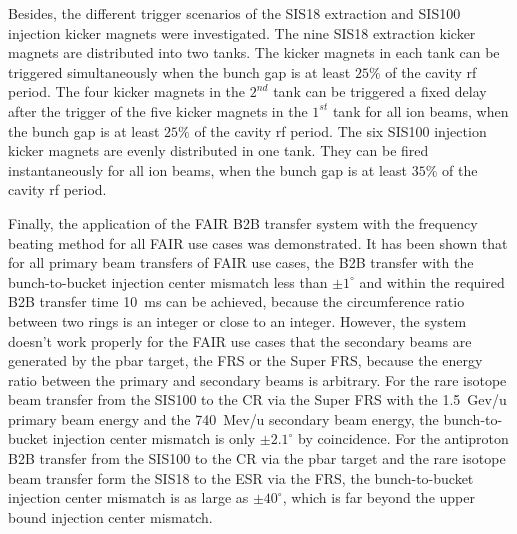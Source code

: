 Besides, the different trigger scenarios of the SIS18 extraction and SIS100 injection kicker magnets were investigated. The nine SIS18 extraction kicker magnets are distributed into two tanks. The kicker magnets in each tank can be triggered simultaneously when the bunch gap is at least $25\%$ of the cavity rf period. The four kicker magnets in the $2^{nd}$ tank can be triggered a fixed delay after the trigger of the five kicker magnets in the $1^{st}$ tank for all ion beams, when the bunch gap is at least $25\%$ of the cavity rf period. The six SIS100 injection kicker magnets are evenly distributed in one tank. They can be fired instantaneously for all ion beams, when the bunch gap is at least $35\%$ of the cavity rf period.

Finally, the application of the FAIR B2B transfer system with the frequency beating method for all FAIR use cases was demonstrated. It has been shown that for all primary beam transfers of FAIR use cases, the B2B transfer with the bunch-to-bucket injection center mismatch less than $\pm1^\circ$ and within the required B2B transfer time \SI{10}{\ms} can be achieved, because the circumference ratio between two rings is an integer or close to an integer. However, the system doesn't work properly for the FAIR use cases that the secondary beams are generated by the pbar target, the FRS or the Super FRS, because the energy ratio between the primary and secondary beams is arbitrary. For the rare isotope beam transfer from the SIS100 to the CR via the Super FRS with the \SI{1.5}{Gev/u} primary beam energy and the \SI{740}{Mev/u} secondary beam energy, the bunch-to-bucket injection center mismatch is only $\pm2.1^\circ$ by coincidence. For the antiproton B2B transfer from the SIS100 to the CR via the pbar target and the rare isotope beam transfer form the SIS18 to the ESR via the FRS, the bunch-to-bucket injection center mismatch is as large as $\pm40^\circ$, which is far beyond the upper bound injection center mismatch.

